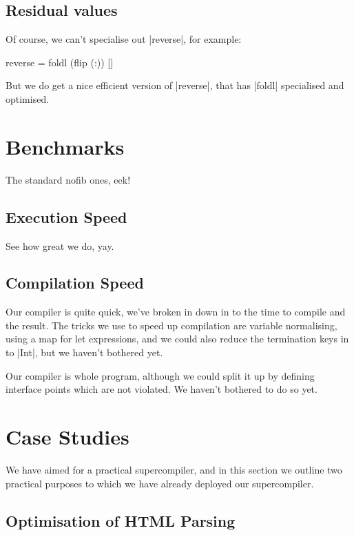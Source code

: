 \documentclass{sigplanconf}
\begin{document}
\subsection{Residual values}

Of course, we can't specialise out |reverse|, for example:

\begin{code}
reverse = foldl (flip (:)) []
\end{code}

But we do get a nice efficient version of |reverse|, that has |foldl| specialised and optimised.

\section{Benchmarks}
\label{sec:benchmarks}

The standard nofib ones, eek!

\subsection{Execution Speed}

See how great we do, yay.

\subsection{Compilation Speed}

Our compiler is quite quick, we've broken in down in to the time to compile and the result. The tricks we use to speed up compilation are variable normalising, using a map for let expressions, and we could also reduce the termination keys in to |Int|, but we haven't bothered yet.

Our compiler is whole program, although we could split it up by defining interface points which are not violated. We haven't bothered to do so yet.

\section{Case Studies}

We have aimed for a practical supercompiler, and in this section we outline two practical purposes to which we have already deployed our supercompiler.

\subsection{Optimisation of HTML Parsing}
\label{sec:tagsoup}
\end{document}

